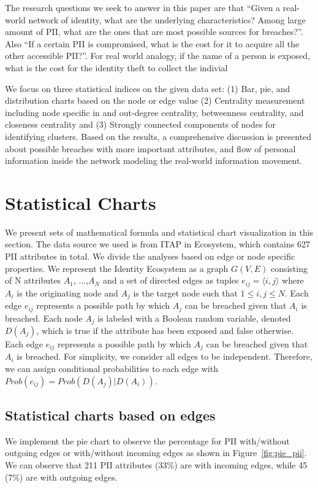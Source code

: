 \documentclass[conference]{IEEEtran}
\begin{document}
The research questions we seek to answer in this paper are that ``Given a real-world network of identity, what are the underlying characteristics? Among large amount of PII, what are the ones that are most possible sources for breaches?''. Also ``If a certain PII is compromised, what is the cost for it to acquire all the other accessible PII?''. For real world analogy, if the name of a person is exposed, what is the cost for the identity theft to collect the indivial

We focus on three statistical indices on the given data set: (1) Bar, pie, and distribution charts based on the node or edge value (2) Centrality measurement including node specific in and out-degree centrality, betweenness centrality, and closeness centrality and (3) Strongly connected  components of nodes for identifying clusters. Based on the results, a comprehensive discussion is presented about possible breaches with more important attributes, and flow of personal information inside the network modeling the real-world information movement. 



\section{Statistical Charts}

We present sets of mathematical formula and statistical chart visualization in this section. The data source we used is from ITAP in Ecosystem, which contains 627 PII attributes in total. We divide the analyses based on edge or node specific properties. We represent the Identity Ecosystem as a graph $G(V, E)$ consisting of N attributes $A_{1}$, ...,$A_{N}$ and a set of directed edges as tuples $e_{ij} = \langle i, j \rangle$ where $A_{i}$ is the originating node and $A_{j}$ is the target node such that $1 \leq i, j \leq N$. Each edge $e_{ij}$ represents a possible path by which $A_{j}$ can be breached given that $A_{i}$ is breached. Each node $A_{j}$ is labeled with a Boolean random variable, denoted $D(A_{j})$, which is true if the attribute has been exposed and false otherwise. Each edge $e_{ij}$ represents a possible path by which $A_{j}$ can be breached given that $A_{i}$ is breached. For simplicity, we consider all edges to be independent. Therefore, we can assign conditional probabilities to each edge with $Prob(e_{ij}) = Prob(D(A_{j})|D(A_{i}))$.

\subsection{Statistical charts based on edges}
We implement the pie chart to observe the percentage for PII with/without outgoing edges or with/without incoming edges as shown in Figure~\ref{fig:pie_pii}. We can observe that 211 PII attributes (33\%) are with incoming edges, while 45 (7\%) are with outgoing edges.
\end{document}

